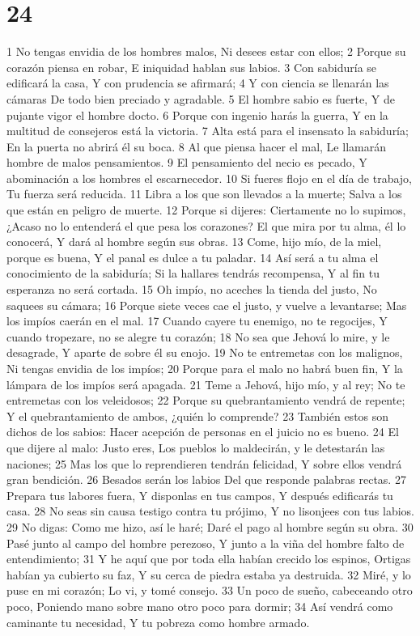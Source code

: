 \chapter{24}

1 No tengas envidia de los hombres malos,
Ni desees estar con ellos;
2 Porque su corazón piensa en robar,
E iniquidad hablan sus labios.
3 Con sabiduría se edificará la casa,
Y con prudencia se afirmará;
4 Y con ciencia se llenarán las cámaras
De todo bien preciado y agradable.
5 El hombre sabio es fuerte,
Y de pujante vigor el hombre docto.
6 Porque con ingenio harás la guerra,
Y en la multitud de consejeros está la victoria.
7 Alta está para el insensato la sabiduría;
En la puerta no abrirá él su boca.
8 Al que piensa hacer el mal,
Le llamarán hombre de malos pensamientos.
9 El pensamiento del necio es pecado,
Y abominación a los hombres el escarnecedor.
10 Si fueres flojo en el día de trabajo,
Tu fuerza será reducida.
11 Libra a los que son llevados a la muerte;
Salva a los que están en peligro de muerte.
12 Porque si dijeres: Ciertamente no lo supimos,
¿Acaso no lo entenderá el que pesa los corazones?
El que mira por tu alma, él lo conocerá,
Y dará al hombre según sus obras.
13 Come, hijo mío, de la miel, porque es buena,
Y el panal es dulce a tu paladar.
14 Así será a tu alma el conocimiento de la sabiduría;
Si la hallares tendrás recompensa,
Y al fin tu esperanza no será cortada.
15 Oh impío, no aceches la tienda del justo,
No saquees su cámara;
16 Porque siete veces cae el justo, y vuelve a levantarse;
Mas los impíos caerán en el mal.
17 Cuando cayere tu enemigo, no te regocijes,
Y cuando tropezare, no se alegre tu corazón;
18 No sea que Jehová lo mire, y le desagrade,
Y aparte de sobre él su enojo.
19 No te entremetas con los malignos,
Ni tengas envidia de los impíos;
20 Porque para el malo no habrá buen fin,
Y la lámpara de los impíos será apagada.
21 Teme a Jehová, hijo mío, y al rey;
No te entremetas con los veleidosos;
22 Porque su quebrantamiento vendrá de repente;
Y el quebrantamiento de ambos,
¿quién lo comprende?
23 También estos son dichos de los sabios:
Hacer acepción de personas en el juicio no es bueno.
24 El que dijere al malo: Justo eres,
Los pueblos lo maldecirán, y le detestarán las naciones;
25 Mas los que lo reprendieren tendrán felicidad,
Y sobre ellos vendrá gran bendición.
26 Besados serán los labios
Del que responde palabras rectas.
27 Prepara tus labores fuera,
Y disponlas en tus campos,
Y después edificarás tu casa.
28 No seas sin causa testigo contra tu prójimo,
Y no lisonjees con tus labios.
29 No digas: Como me hizo, así le haré;
Daré el pago al hombre según su obra.
30 Pasé junto al campo del hombre perezoso,
Y junto a la viña del hombre falto de entendimiento;
31 Y he aquí que por toda ella habían crecido los espinos,
Ortigas habían ya cubierto su faz,
Y su cerca de piedra estaba ya destruida.
32 Miré, y lo puse en mi corazón;
Lo vi, y tomé consejo.
33 Un poco de sueño, cabeceando otro poco,
Poniendo mano sobre mano otro poco para dormir;
34 Así vendrá como caminante tu necesidad,
Y tu pobreza como hombre armado. 

